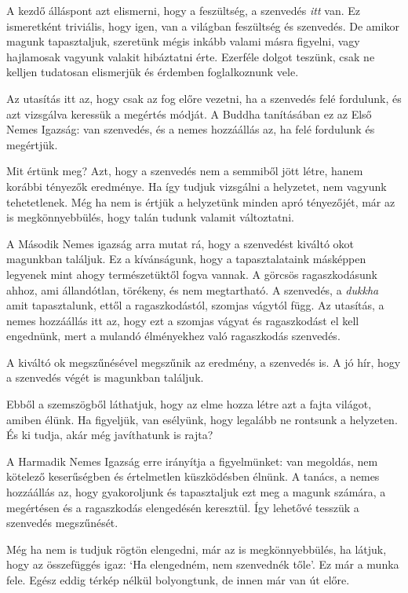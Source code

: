 
A kezdő álláspont azt elismerni, hogy a feszültség, a szenvedés
\emph{itt} van. Ez ismeretként triviális, hogy igen, van a világban
feszültség és szenvedés. De amikor magunk tapasztaljuk, szeretünk mégis
inkább valami másra figyelni, vagy hajlamosak vagyunk valakit hibáztatni
érte. Ezerféle dolgot teszünk, csak ne kelljen tudatosan elismerjük és
érdemben foglalkoznunk vele.

Az utasítás itt az, hogy csak az fog előre vezetni, ha a szenvedés felé
fordulunk, és azt vizsgálva keressük a megértés módját. A Buddha
tanításában ez az Első Nemes Igazság: van szenvedés, és a nemes
hozzáállás az, ha felé fordulunk és megértjük.

Mit értünk meg? Azt, hogy a szenvedés nem a semmiből jött létre, hanem
korábbi tényezők eredménye. Ha így tudjuk vizsgálni a helyzetet, nem
vagyunk tehetetlenek. Még ha nem is értjük a helyzetünk minden apró
tényezőjét, már az is megkönnyebbülés, hogy talán tudunk valamit
változtatni.


A Második Nemes igazság arra mutat rá, hogy a szenvedést kiváltó okot
magunkban találjuk. Ez a kívánságunk, hogy a tapasztalataink másképpen
legyenek mint ahogy természetüktől fogva vannak. A görcsös
ragaszkodásunk ahhoz, ami állandótlan, törékeny, és nem megtartható. A
szenvedés, a \emph{dukkha} amit tapasztalunk, ettől a ragaszkodástól,
szomjas vágytól függ. Az utasítás, a nemes hozzáállás itt az, hogy ezt a
szomjas vágyat és ragaszkodást el kell engednünk, mert a mulandó
élményekhez való ragaszkodás szenvedés.


A kiváltó ok megszűnésével megszűnik az eredmény, a szenvedés is. A jó
hír, hogy a szenvedés végét is magunkban találjuk.

Ebből a szemszögből láthatjuk, hogy az elme hozza létre azt a fajta
világot, amiben élünk. Ha figyeljük, van esélyünk, hogy legalább ne
rontsunk a helyzeten. És ki tudja, akár még javíthatunk is rajta?

A Harmadik Nemes Igazság erre irányítja a figyelmünket: van megoldás,
nem kötelező keserűségben és értelmetlen küszködésben élnünk. A tanács,
a nemes hozzáállás az, hogy gyakoroljunk és tapasztaljuk ezt meg a
magunk számára, a megértésen és a ragaszkodás elengedésén keresztül. Így
lehetővé tesszük a szenvedés megszűnését.

Még ha nem is tudjuk rögtön elengedni, már az is megkönnyebbülés, ha
látjuk, hogy az összefüggés igaz: `Ha elengedném, nem szenvednék tőle'.
Ez már a munka fele. Egész eddig térkép nélkül bolyongtunk, de innen már
van út előre.

